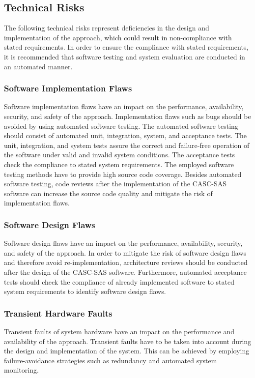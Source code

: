 \subsection{Technical Risks}
\label{sec:risk_assessment_technical}
The following technical risks represent deficiencies in the design and implementation of the approach, which could result in non-compliance with stated requirements.
In order to ensure the compliance with stated requirements, it is recommended that software testing and system evaluation are conducted in an automated manner.

\subsubsection{Software Implementation Flaws}
Software implementation flaws have an impact on the performance, availability, security, and safety of the approach.
Implementation flaws such as bugs should be avoided by using automated software testing.
The automated software testing should consist of automated unit, integration, system, and acceptance tests.
The unit, integration, and system tests assure the correct and failure-free operation of the software under valid and invalid system conditions.
The acceptance tests check the compliance to stated system requirements.
The employed software testing methods have to provide high source code coverage.
Besides automated software testing, code reviews after the implementation of the CASC-SAS software can increase the source code quality and mitigate the risk of implementation flaws.

\subsubsection{Software Design Flaws}
Software design flaws have an impact on the performance, availability, security, and safety of the approach.
In order to mitigate the risk of software design flaws and therefore avoid re-implementation, architecture reviews should be conducted after the design of the CASC-SAS software.
Furthermore, automated acceptance tests should check the compliance of already implemented software to stated system requirements to identify software design flaws.

\subsubsection{Transient Hardware Faults}
Transient faults of system hardware have an impact on the performance and availability of the approach.
Transient faults have to be taken into account during the design and implementation of the system.
This can be achieved by employing failure-avoidance strategies such as redundancy and automated system monitoring.

